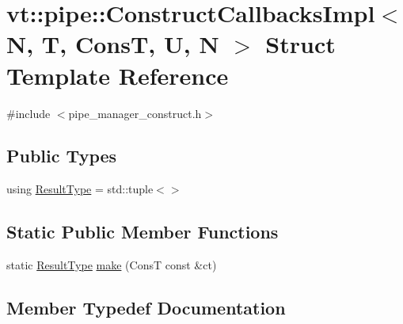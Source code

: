 \hypertarget{structvt_1_1pipe_1_1_construct_callbacks_impl_3_01_n_00_01_t_00_01_cons_t_00_01_u_00_01_n_01_4}{}\section{vt\+:\+:pipe\+:\+:Construct\+Callbacks\+Impl$<$ N, T, ConsT, U, N $>$ Struct Template Reference}
\label{structvt_1_1pipe_1_1_construct_callbacks_impl_3_01_n_00_01_t_00_01_cons_t_00_01_u_00_01_n_01_4}


{\ttfamily \#include $<$pipe\+\_\+manager\+\_\+construct.\+h$>$}

\subsection*{Public Types}
\begin{DoxyCompactItemize}
\item 
using \hyperlink{structvt_1_1pipe_1_1_construct_callbacks_impl_3_01_n_00_01_t_00_01_cons_t_00_01_u_00_01_n_01_4_ae8850475c6b6387225345a76eb645fd5}{Result\+Type} = std\+::tuple$<$$>$
\end{DoxyCompactItemize}
\subsection*{Static Public Member Functions}
\begin{DoxyCompactItemize}
\item 
static \hyperlink{structvt_1_1pipe_1_1_construct_callbacks_impl_3_01_n_00_01_t_00_01_cons_t_00_01_u_00_01_n_01_4_ae8850475c6b6387225345a76eb645fd5}{Result\+Type} \hyperlink{structvt_1_1pipe_1_1_construct_callbacks_impl_3_01_n_00_01_t_00_01_cons_t_00_01_u_00_01_n_01_4_a40ef1f8dedef213f27c603452ff8df66}{make} (ConsT const \&ct)
\end{DoxyCompactItemize}


\subsection{Member Typedef Documentation}
\mbox{\label{structvt_1_1pipe_1_1_construct_callbacks_impl_3_01_n_00_01_t_00_01_cons_t_00_01_u_00_01_n_01_4_ae8850475c6b6387225345a76eb645fd5}} 
